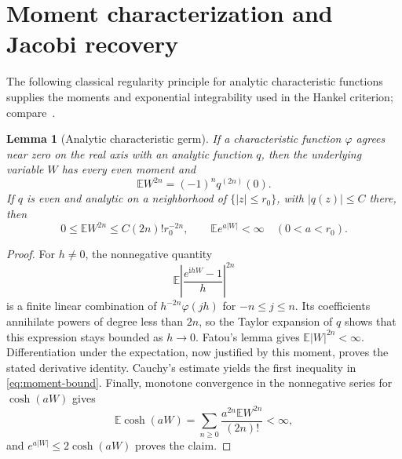 \documentclass[11pt,twoside]{article}
\theoremstyle{journalplain}
\numberwithin{equation}{section}
\newtheorem{lemma}[theorem]{Lemma}
\theoremstyle{journaldefinition}
\newcommand{\E}{\mathbb E}
\newcommand{\ii}{\mathrm i}
\begin{document}
\section{Moment characterization and Jacobi recovery}\label{app:hankel}
The following classical regularity principle for analytic characteristic functions supplies the moments and exponential integrability used in the Hankel criterion; compare\ \cite{LukacsSzasz1952}.
\begin{lemma}[Analytic characteristic germ]\label{lem:germ}
If a characteristic function $\varphi$ agrees near zero on the real axis with an analytic function $q$, then the underlying variable $W$ has every even moment and
\[
 \E W^{2n}=(-1)^nq^{(2n)}(0).
\]
If $q$ is even and analytic on a neighborhood of $\{|z|\le r_0\}$, with $|q(z)|\le C$ there, then
\begin{equation}\label{eq:moment-bound}
 0\le\E W^{2n}\le C(2n)!r_0^{-2n},\qquad
 \E e^{a|W|}<\infty\quad(0<a<r_0).
\end{equation}
\end{lemma}
\begin{proof}
For $h\ne0$, the nonnegative quantity
\[
 \E\left|\frac{e^{\ii hW}-1}{h}\right|^{2n}
\]
is a finite linear combination of $h^{-2n}\varphi(jh)$ for $-n\le j\le n$. Its coefficients annihilate powers of degree less than $2n$, so the Taylor expansion of $q$ shows that this expression stays bounded as $h\to0$. Fatou's lemma gives $\E |W|^{2n}<\infty$. Differentiation under the expectation, now justified by this moment, proves the stated derivative identity. Cauchy's estimate yields the first inequality in \eqref{eq:moment-bound}. Finally, monotone convergence in the nonnegative series for $\cosh(aW)$ gives
\[
 \E\cosh(aW)=\sum_{n\ge0}\frac{a^{2n}\E W^{2n}}{(2n)!}<\infty,
\]
and $e^{a|W|}\le2\cosh(aW)$ proves the claim.
\end{proof}
\end{document}
